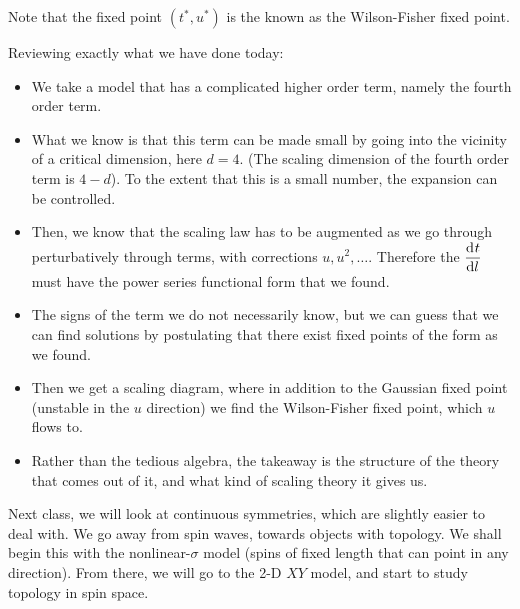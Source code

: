 Note that the fixed point $(t^*, u^*)$ is the known as the Wilson-Fisher fixed point.

Reviewing exactly what we have done today:
\begin{itemize}
    \item We take a model that has a complicated higher order term, namely the fourth order term.
    \item What we know is that this term can be made small by going into the vicinity of a critical dimension, here $d = 4$. (The scaling dimension of the fourth order term is $4-d$). To the extent that this is a small number, the expansion can be controlled.
    \item Then, we know that the scaling law has to be augmented as we go through perturbatively through terms, with corrections $u, u^2, \ldots$. Therefore the $\dod{t}{l}$ must have the power series functional form that we found. \item The signs of the term we do not necessarily know, but we can guess that we can find solutions by postulating that there exist fixed points of the form as we found.
    \item Then we get a scaling diagram, where in addition to the Gaussian fixed point (unstable in the $u$ direction) we find the Wilson-Fisher fixed point, which $u$ flows to.
    \item Rather than the tedious algebra, the takeaway is the structure of the theory that comes out of it, and what kind of scaling theory it gives us.
\end{itemize}

Next class, we will look at continuous symmetries, which are slightly easier to deal with. We go away from spin waves, towards objects with topology. We shall begin this with the nonlinear-$\sigma$ model (spins of fixed length that can point in any direction). From there, we will go to the 2-D $XY$ model, and start to study topology in spin space.